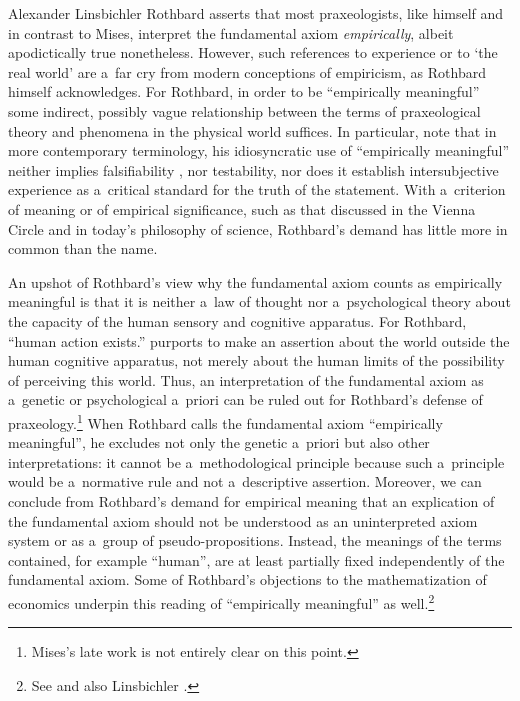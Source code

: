 \begin{artengenv}{Alexander Linsbichler}
Rothbard 
\parencite*[][pp.33–34]{rothbard_praxeology_2011} %
 asserts that most praxeologists, like himself and in contrast to Mises, interpret the fundamental axiom \textit{empirically}, albeit apodictically true nonetheless. However, such references to experience or to ‘the real world' are a~far cry from modern conceptions of empiricism, as Rothbard 
\parencite*[][p.318]{rothbard_defense_1957} %
 himself acknowledges. For Rothbard, in order to be ``empirically meaningful'' some indirect, possibly vague relationship between the terms of praxeological theory and phenomena in the physical world suffices. In particular, note that in more contemporary terminology, his idiosyncratic use of ``empirically meaningful'' neither implies falsifiability 
\parencite[][p.25]{rothbard_praxeology:_1976}, %
 nor testability, nor does it establish intersubjective experience as a~critical standard for the truth of the statement. With a~criterion of meaning or of empirical significance, such as that discussed in the Vienna Circle and in today's philosophy of science, Rothbard's demand has little more in common than the name.



An upshot of Rothbard's view why the fundamental axiom counts as empirically meaningful is that it is neither a~law of thought nor a~psychological theory about the capacity of the human sensory and cognitive apparatus. For Rothbard, ``human action exists.'' purports to make an assertion about the world outside the human cognitive apparatus, not merely about the human limits of the possibility of perceiving this world. Thus, an interpretation of the fundamental axiom as a~genetic or psychological a~priori can be ruled out for Rothbard's defense of praxeology.\footnote{Mises's late work 
\parencites[][]{mises_ultimate_1962}[][]{mises_ultimate_2012} %
 is not entirely clear on this point.} When Rothbard calls the fundamental axiom ``empirically meaningful'', he excludes not only the genetic a~priori but also other interpretations: it cannot be a~methodological principle because such a~principle would be a~normative rule and not a~descriptive assertion. Moreover, we can conclude from Rothbard's demand for empirical meaning that an explication of the fundamental axiom should not be understood as an uninterpreted axiom system or as a~group of pseudo-propositions. Instead, the meanings of the terms contained, for example ``human'', are at least partially fixed independently of the fundamental axiom. Some of Rothbard's objections to the mathematization of economics underpin this reading of ``empirically meaningful'' as well.\footnote{See 
\parencite[][pp.21–24]{rothbard_praxeology:_1976} %
 and also Linsbichler 
\parencites*[][]{linsbichler_sprachgeist_2021}[][]{linsbichler_case_2023}. %
 }


\end{artengenv}
